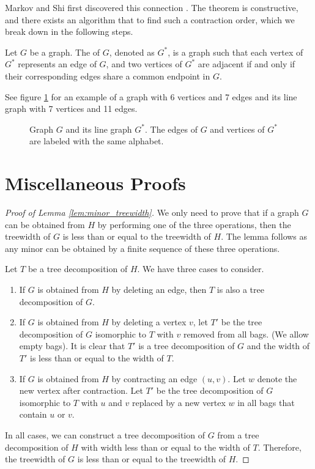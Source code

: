 Markov and Shi first discovered this connection \cite{Markov_2008}.
The theorem is constructive, and there exists an algorithm that to find such a contraction order, which we break down in the following steps.

\begin{definition}
	Let $G$ be a graph. The  of $G$, denoted as $G^*$, is a graph such that each vertex of $G^*$ represents an edge of $G$, and two vertices of $G^*$ are adjacent if and only if their corresponding edges share a common endpoint in $G$.
\end{definition}

\begin{example}
	See figure \ref{fig:line_graph_1} for an example of a graph with 6 vertices and 7 edges and its line graph with 7 vertices and 11 edges.
\end{example}

\begin{figure}[ht]
	\centering
	
	\caption{Graph $G$ and its line graph $G^*$. The edges of $G$ and vertices of $G^*$ are labeled with the same alphabet.}
	\label{fig:line_graph_1}
\end{figure}


\section{Miscellaneous Proofs}\label{sec:proofs}

\begin{proof}[Proof of Lemma \ref{lem:minor_treewidth}]
	We only need to prove that if a graph $G$ can be obtained from $H$ by performing one of the three operations, then the treewidth of $G$ is less than or equal to the treewidth of $H$. The lemma follows as any minor can be obtained by a finite sequence of these three operations.

	Let $T$ be a tree decomposition of $H$.
	We have three cases to consider.
	\begin{enumerate}
		\item If $G$ is obtained from $H$ by deleting an edge, then $T$ is also a tree decomposition of $G$. 
		\item If $G$ is obtained from $H$ by deleting a vertex $v$, let $T'$ be the tree decomposition of $G$ isomorphic to $T$ with $v$ removed from all bags. (We allow empty bags). It is clear that $T'$ is a tree decomposition of $G$ and the width of $T'$ is less than or equal to the width of $T$.
		\item If $G$ is obtained from $H$ by contracting an edge $(u, v)$. Let $w$ denote the new vertex after contraction. 
		Let $T'$ be the tree decomposition of $G$ isomorphic to $T$ with $u$ and $v$ replaced by a new vertex $w$ in all bags that contain $u$ or $v$. 
	\end{enumerate}

	In all cases, we can construct a tree decomposition of $G$ from a tree decomposition of $H$ with width less than or equal to the width of $T$. Therefore, the treewidth of $G$ is less than or equal to the treewidth of $H$.
\end{proof}


